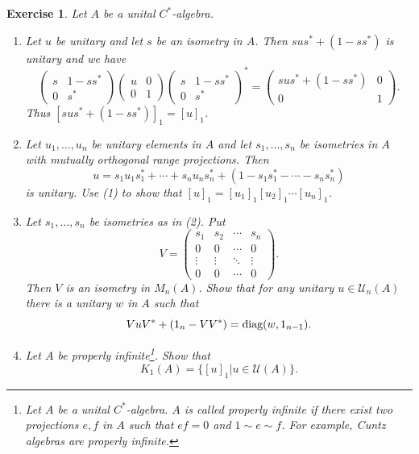 \documentclass{book}
\newtheorem{exercise}{Exercise}[section]
\def\cstar{\(C^*\)-algebra}
\def\diag{\textnormal{diag}}
\begin{document}
\begin{exercise}\label{ex:738}
  Let \(A\) be a unital \cstar.
  \begin{enumerate} 
    \item Let \(u\) be unitary and let \(s\) be an isometry in \(A\). Then \(sus^*+(1-ss^*)\) is unitary
    and we have
    \[
    \begin{pmatrix}
      s&1-ss^*\\0&s^*  
    \end{pmatrix}
    \begin{pmatrix}
      u&0\\0&1
    \end{pmatrix}
    {\begin{pmatrix}
      s&1-ss^*\\0&s^*
    \end{pmatrix}}^*=
    \begin{pmatrix}
      sus^*+(1-ss^*)&0\\0&1
    \end{pmatrix}.
    \]
    Thus \({[sus^*+(1-ss^*)]}_1={[u]}_1\).
  \item Let \(u_1,\ldots,u_n\) be unitary elements in \(A\) and let \(s_1,\ldots,s_n\) be 
  isometries in \(A\) with mutually orthogonal range projections. Then
  \[
    u=s_1u_1s^*_1+\cdots+s_n u_n s_n^*+(1-s_1 s_1^*-\cdots-s_n s_n^*)
  \]
  is unitary. Use (1) to show that \({[u]}_1={[u_1]}_1{[u_2]}_1\cdots{[u_n]}_1\).
  \item Let \(s_1,\ldots,s_n\) be isometries as in (2). Put
  \[
    V=\begin{pmatrix}
      s_1&s_2&\cdots& s_n\\
      0&0&\cdots &0\\
      \vdots&\vdots&\ddots&\vdots\\
      0&0&\cdots&0
    \end{pmatrix}.
  \]
  Then \(V\) is an isometry in \(M_n(A)\). Show that for any unitary \(u\in\mathcal{U}_n(A)\)
  there is a unitary \(w\) in \(A\) such that
  \[
    VuV^*+(1_n-VV^*)=\diag(w,1_{n-1}).
  \]
  \item Let \(A\) be \textnormal{properly infinite}\footnote{
    Let \(A\) be a unital \cstar. \(A\)
    is called \textit{properly infinite} if there exist two projections \(e,f\) in \(A\) such that \(ef = 0\) and
    \(1 \sim e \sim f\). For example, Cuntz algebras are properly infinite.
  }. Show that
  \[
    K_1(A)=\{{[u]}_1| u\in\mathcal{U}(A)\}.
  \]
  \end{enumerate}
\end{exercise}
\end{document}
